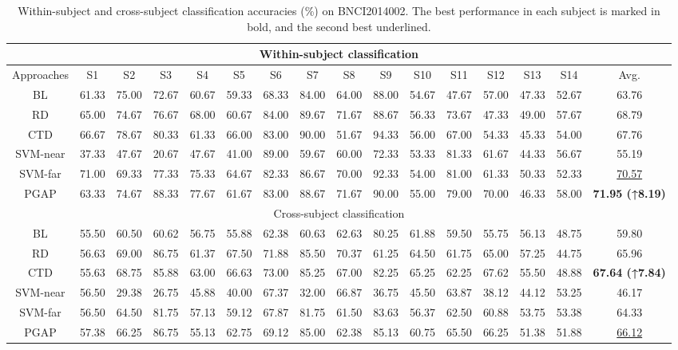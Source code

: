 \documentclass[journal,twocolumn]{IEEEtran}
\begin{document}
\begin{table}[htpb] \centering
  \caption{Within-subject and cross-subject classification accuracies (\%) on BNCI2014002. The best performance in each subject is marked in bold, and the second best underlined.}
  \label{tab:2014002-result}
  \begin{tabular}{c|c|c|c|c|c|c|c|c|c|c|c|c|c|c|c}
  \toprule
  \multicolumn{16}{c}{Within-subject classification} \\
  \midrule
  Approaches & S1 & S2 & S3 & S4 & S5 & S6 & S7 & S8 & S9 & S10 & S11 & S12 & S13 & S14 & Avg. \\
  \midrule
  BL & 61.33 & 75.00 & 72.67 & 60.67 & 59.33 & 68.33 & 84.00 & 64.00 & 88.00 & 54.67 & 47.67 & 57.00 & 47.33 & 52.67 & 63.76 \\
  RD & 65.00 & 74.67 & 76.67 & 68.00 & 60.67 & 84.00 & 89.67 & 71.67 & 88.67 & 56.33 & 73.67 & 47.33 & 49.00 & 57.67 & 68.79 \\
  CTD & 66.67 & 78.67 & 80.33 & 61.33 & 66.00 & 83.00 & 90.00 & 51.67 & 94.33 & 56.00 & 67.00 & 54.33 & 45.33 & 54.00 & 67.76 \\
  SVM-near & 37.33 & 47.67 & 20.67 & 47.67 & 41.00 & 89.00 & 59.67 & 60.00 & 72.33 & 53.33 & 81.33 & 61.67 & 44.33 & 56.67 & 55.19 \\
  SVM-far & 71.00 & 69.33 & 77.33 & 75.33 & 64.67 & 82.33 & 86.67 & 70.00 & 92.33 & 54.00 & 81.00 & 61.33 & 50.33 & 52.33 & \underline{70.57} \\
  PGAP & 63.33 & 74.67 & 88.33 & 77.67 & 61.67 & 83.00 & 88.67 & 71.67 & 90.00 & 55.00 & 79.00 & 70.00 & 46.33 & 58.00 & \textbf{71.95 (↑8.19)} \\
  \midrule
  \multicolumn{16}{c}{Cross-subject classification} \\
  \midrule
  BL & 55.50 & 60.50 & 60.62 & 56.75 & 55.88 & 62.38 & 60.63 & 62.63 & 80.25 & 61.88 & 59.50 & 55.75 & 56.13 & 48.75 & 59.80 \\
  RD & 56.63 & 69.00 & 86.75 & 61.37 & 67.50 & 71.88 & 85.50 & 70.37 & 61.25 & 64.50 & 61.75 & 65.00 & 57.25 & 44.75 & 65.96 \\
  CTD & 55.63 & 68.75 & 85.88 & 63.00 & 66.63 & 73.00 & 85.25 & 67.00 & 82.25 & 65.25 & 62.25 & 67.62 & 55.50 & 48.88 & \textbf{67.64 (↑7.84)} \\
  SVM-near & 56.50 & 29.38 & 26.75 & 45.88 & 40.00 & 67.37 & 32.00 & 66.87 & 36.75 & 45.50 & 63.87 & 38.12 & 44.12 & 53.25 & 46.17 \\
  SVM-far & 56.50 & 64.50 & 81.75 & 57.13 & 59.12 & 67.87 & 81.75 & 61.50 & 83.63 & 56.37 & 62.50 & 60.88 & 53.75 & 53.38 & 64.33 \\
  PGAP & 57.38 & 66.25 & 86.75 & 55.13 & 62.75 & 69.12 & 85.00 & 62.38 & 85.13 & 60.75 & 65.50 & 66.25 & 51.38 & 51.88 & \underline{66.12} \\
  \bottomrule
  \end{tabular}
\end{table}
\end{document}
